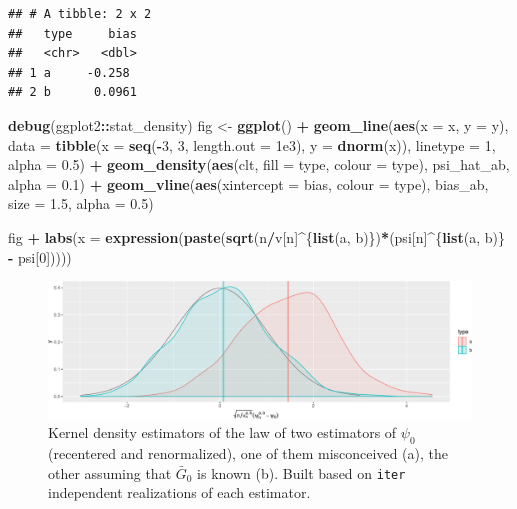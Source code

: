 \documentclass[]{article}
\newenvironment{Shaded}{\begin{snugshade}}{\end{snugshade}}
\newcommand{\DataTypeTok}[1]{\textcolor[rgb]{0.13,0.29,0.53}{#1}}
\newcommand{\DecValTok}[1]{\textcolor[rgb]{0.00,0.00,0.81}{#1}}
\newcommand{\FloatTok}[1]{\textcolor[rgb]{0.00,0.00,0.81}{#1}}
\newcommand{\KeywordTok}[1]{\textcolor[rgb]{0.13,0.29,0.53}{\textbf{#1}}}
\newcommand{\NormalTok}[1]{#1}
\newcommand{\OperatorTok}[1]{\textcolor[rgb]{0.81,0.36,0.00}{\textbf{#1}}}
\newcommand{\StringTok}[1]{\textcolor[rgb]{0.31,0.60,0.02}{#1}}
\newcommand{\Gbar}{\bar{G}}
\theoremstyle{definition}
\theoremstyle{definition}
\theoremstyle{definition}
\theoremstyle{remark}
\begin{document}
\begin{verbatim}
## # A tibble: 2 x 2
##   type     bias
##   <chr>   <dbl>
## 1 a     -0.258 
## 2 b      0.0961
\end{verbatim}

\begin{Shaded}
\begin{Highlighting}[]
\KeywordTok{debug}\NormalTok{(ggplot2}\OperatorTok{::}\NormalTok{stat_density)}
\NormalTok{fig <-}\StringTok{ }\KeywordTok{ggplot}\NormalTok{() }\OperatorTok{+}
\StringTok{  }\KeywordTok{geom_line}\NormalTok{(}\KeywordTok{aes}\NormalTok{(}\DataTypeTok{x =}\NormalTok{ x, }\DataTypeTok{y =}\NormalTok{ y), }
            \DataTypeTok{data =} \KeywordTok{tibble}\NormalTok{(}\DataTypeTok{x =} \KeywordTok{seq}\NormalTok{(}\OperatorTok{-}\DecValTok{3}\NormalTok{, }\DecValTok{3}\NormalTok{, }\DataTypeTok{length.out =} \FloatTok{1e3}\NormalTok{),}
                          \DataTypeTok{y =} \KeywordTok{dnorm}\NormalTok{(x)),}
            \DataTypeTok{linetype =} \DecValTok{1}\NormalTok{, }\DataTypeTok{alpha =} \FloatTok{0.5}\NormalTok{) }\OperatorTok{+}
\StringTok{  }\KeywordTok{geom_density}\NormalTok{(}\KeywordTok{aes}\NormalTok{(clt, }\DataTypeTok{fill =}\NormalTok{ type, }\DataTypeTok{colour =}\NormalTok{ type),}
\NormalTok{               psi_hat_ab, }\DataTypeTok{alpha =} \FloatTok{0.1}\NormalTok{) }\OperatorTok{+}
\StringTok{  }\KeywordTok{geom_vline}\NormalTok{(}\KeywordTok{aes}\NormalTok{(}\DataTypeTok{xintercept =}\NormalTok{ bias, }\DataTypeTok{colour =}\NormalTok{ type),}
\NormalTok{             bias_ab, }\DataTypeTok{size =} \FloatTok{1.5}\NormalTok{, }\DataTypeTok{alpha =} \FloatTok{0.5}\NormalTok{)}
  
\NormalTok{fig }\OperatorTok{+}
\StringTok{  }\KeywordTok{labs}\NormalTok{(}\DataTypeTok{x =} \KeywordTok{expression}\NormalTok{(}\KeywordTok{paste}\NormalTok{(}\KeywordTok{sqrt}\NormalTok{(n}\OperatorTok{/}\NormalTok{v[n]}\OperatorTok{^}\NormalTok{\{}\KeywordTok{list}\NormalTok{(a, b)\})}\OperatorTok{*}\NormalTok{(psi[n]}\OperatorTok{^}\NormalTok{\{}\KeywordTok{list}\NormalTok{(a, b)\} }\OperatorTok{-}\StringTok{ }\NormalTok{psi[}\DecValTok{0}\NormalTok{]))))}
\end{Highlighting}
\end{Shaded}

\begin{figure}
\centering
\includegraphics{img/known-Gbar-one-b-1.pdf}
\caption{\label{fig:known-Gbar-one-b}Kernel density estimators of the law of
two estimators of \(\psi_{0}\) (recentered and renormalized), one of
them misconceived (a), the other assuming that \(\Gbar_{0}\) is known
(b). Built based on \texttt{iter} independent realizations of each
estimator.}
\end{figure}
\end{document}

